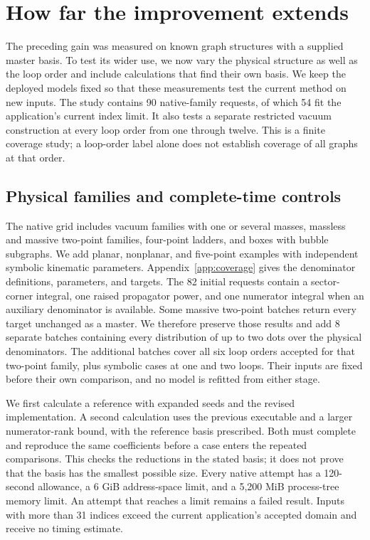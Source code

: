 \providecommand{\CoverageVacuumDerivation}{Appendix~\ref{app:vacuum}}
\section{How far the improvement extends}
\label{sec:coverage}
The preceding gain was measured on known graph structures with a supplied master basis. To test its wider use, we now vary the physical structure as well as the loop order and include calculations that find their own basis. We keep the deployed models fixed so that these measurements test the current method on new inputs. The study contains 90 native-family requests, of which 54 fit the application's current index limit. It also tests a separate restricted vacuum construction at every loop order from one through twelve. This is a finite coverage study; a loop-order label alone does not establish coverage of all graphs at that order.

\subsection{Physical families and complete-time controls}
The native grid includes vacuum families with one or several masses, massless and massive two-point families, four-point ladders, and boxes with bubble subgraphs. We add planar, nonplanar, and five-point examples with independent symbolic kinematic parameters. Appendix~\ref{app:coverage} gives the denominator definitions, parameters, and targets. The 82 initial requests contain a sector-corner integral, one raised propagator power, and one numerator integral when an auxiliary denominator is available. Some massive two-point batches return every target unchanged as a master. We therefore preserve those results and add 8 separate batches containing every distribution of up to two dots over the physical denominators. The additional batches cover all six loop orders accepted for that two-point family, plus symbolic cases at one and two loops. Their inputs are fixed before their own comparison, and no model is refitted from either stage.

We first calculate a reference with expanded seeds and the revised implementation. A second calculation uses the previous executable and a larger numerator-rank bound, with the reference basis prescribed. Both must complete and reproduce the same coefficients before a case enters the repeated comparisons. This checks the reductions in the stated basis; it does not prove that the basis has the smallest possible size. Every native attempt has a 120-second allowance, a 6 GiB address-space limit, and a 5,200 MiB process-tree memory limit. An attempt that reaches a limit remains a failed result. Inputs with more than 31 indices exceed the current application's accepted domain and receive no timing estimate.

